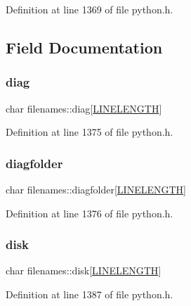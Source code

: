 Definition at line 1369 of file python.\+h.



\subsection{Field Documentation}
\mbox{\label{structfilenames_a21f31ce0b0f82a7f5cf0d456088515fe}} 
\subsubsection{\texorpdfstring{diag}{diag}}
{\footnotesize\ttfamily char filenames\+::diag\mbox{[}\hyperlink{xlog_8c_a10e8c7b8458375c3dbfbb4010a2aba8c}{L\+I\+N\+E\+L\+E\+N\+G\+TH}\mbox{]}}



Definition at line 1375 of file python.\+h.

\mbox{\label{structfilenames_a7bb82526145f9ba7f331da3cb3874280}} 
\subsubsection{\texorpdfstring{diagfolder}{diagfolder}}
{\footnotesize\ttfamily char filenames\+::diagfolder\mbox{[}\hyperlink{xlog_8c_a10e8c7b8458375c3dbfbb4010a2aba8c}{L\+I\+N\+E\+L\+E\+N\+G\+TH}\mbox{]}}



Definition at line 1376 of file python.\+h.

\mbox{\label{structfilenames_a5bf5e6c9f50e525d5df91800b2c1becc}} 
\subsubsection{\texorpdfstring{disk}{disk}}
{\footnotesize\ttfamily char filenames\+::disk\mbox{[}\hyperlink{xlog_8c_a10e8c7b8458375c3dbfbb4010a2aba8c}{L\+I\+N\+E\+L\+E\+N\+G\+TH}\mbox{]}}



Definition at line 1387 of file python.\+h.

\mbox{\label{structfilenames_ad69a4b6cb667c701b42275495c4cd002}} 
